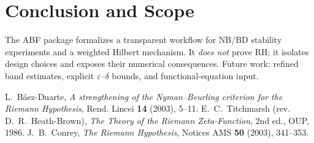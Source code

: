 \documentclass[11pt]{article}
\theoremstyle{remark}
\begin{document}
\section{Conclusion and Scope}
The ABF package formalizes a transparent workflow for NB/BD stability experiments and a weighted Hilbert mechanism.
It \emph{does not} prove RH; it isolates design choices and exposes their numerical consequences.
Future work: refined band estimates, explicit $\varepsilon$--$\delta$ bounds, and functional-equation input.

\begin{thebibliography}{9}
L.~B\'aez-Duarte, \emph{A strengthening of the Nyman--Beurling criterion for the Riemann Hypothesis}, Rend. Lincei \textbf{14} (2003), 5--11.
E.~C.~Titchmarsh (rev. D.~R.~Heath-Brown), \emph{The Theory of the Riemann Zeta-Function}, 2nd ed., OUP, 1986.
J.~B.~Conrey, \emph{The Riemann Hypothesis}, Notices AMS \textbf{50} (2003), 341--353.
\end{thebibliography}
\end{document}
